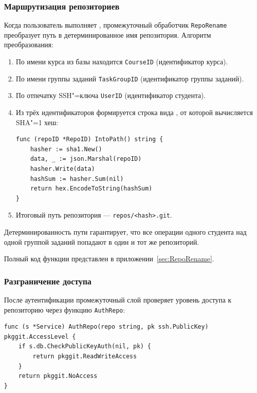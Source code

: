 \documentclass[coursework]{SCWorks}
\begin{document}
\subsubsection{Маршрутизация репозиториев}

Когда пользователь выполняет   , промежуточный обработчик \texttt{RepoRename} преобразует путь  в детерминированное имя репозитория. Алгоритм преобразования:

\begin{enumerate}
	\item По имени курса из базы находится \texttt{CourseID} (идентификатор курса).
	\item По имени группы заданий \texttt{TaskGroupID} (идентификатор группы заданий).
	\item По отпечатку SSH"=ключа  \texttt{UserID} (идентификатор студента).
	\item Из трёх идентификаторов формируется строка вида , от которой вычисляется SHA"=1 хеш:

	      \begin{verbatim}
func (repoID *RepoID) IntoPath() string {
    hasher := sha1.New()
    data, _ := json.Marshal(repoID)
    hasher.Write(data)
    hashSum := hasher.Sum(nil)
    return hex.EncodeToString(hashSum)
}
\end{verbatim}

	\item Итоговый путь репозитория --- \texttt{repos/<hash>.git}.
\end{enumerate}

Детерминированность пути гарантирует, что все операции одного студента над одной группой заданий попадают в один и тот же репозиторий.

Полный код функции  представлен в приложении~\ref{sec:RepoRename}.

\subsubsection{Разграничение доступа}

После аутентификации промежуточный слой проверяет уровень доступа к репозиторию через функцию \texttt{AuthRepo}:

\begin{verbatim}
func (s *Service) AuthRepo(repo string, pk ssh.PublicKey) pkggit.AccessLevel {
    if s.db.CheckPublicKeyAuth(nil, pk) {
        return pkggit.ReadWriteAccess
    }
    return pkggit.NoAccess
}
\end{verbatim}
\end{document}
